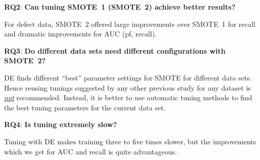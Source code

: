 \documentclass[sigconf,review, anonymous]{acmart}
\theoremstyle{break}
\begin{document}
 \textbf{RQ2}: \textbf{Can tuning SMOTE~1 (SMOTE~2) achieve better results?} 
 
 \begin{lesson}For defect data, SMOTE~2  
 offered  large  improvements over SMOTE~1 for recall
 and dramatic improvements for AUC (pf, recall).
 \end{lesson}
 
 \textbf{RQ3}: \textbf{Do different data sets
      need different configurations with SMOTE~2?} 
 
 \begin{lesson}DE finds different ``best'' parameter settings for SMOTE for different data sets. Hence reusing tunings  suggested  by  any other  previous study  for any dataset is \underline{{\em not}} recommended. Instead,  it is better to
      use automatic tuning  methods  to find the best tuning parameters for the current data set.
 \end{lesson}
   \textbf{RQ4}: \textbf{Is tuning extremely slow?} 
 
 \begin{lesson}Tuning with DE makes training three to five times slower, but the improvements which we get for AUC and recall is quite advantageous.
 \end{lesson}
 
\end{document}
